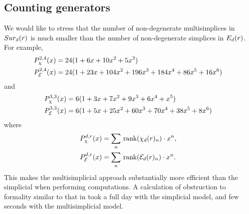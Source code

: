 
\subsection{Counting generators}

We would like to stress that the number of non-degenerate multisimplices in $Sur_d(r)$ is much smaller than the number of non-degenerate simplices in $E_d(r)$.
For example,
\begin{align*}
	& P_\chi^{2,4}(x) = 24(1+6x+10x^2+5x^3) \\
	& P_{\mathcal{E}}^{2,4}(x) = 24(1+23x+104x^2+196x^3+184x^4+86x^5+16x^6)
\end{align*}
and
\begin{align*}
	& P_\chi^{3,3}(x) = 6(1+3x+7x^2+9x^3+6x^4+x^5) \\
	& P_{\mathcal{E}}^{3,3}(x) = 6(1+5x+25x^2+60x^3+70x^4+38x^5+8x^6 )
\end{align*}
where
\begin{align*}
	P_\chi^{d,r}(x) &= \sum_n \,\operatorname{rank}(\chi_d(r)_n) \cdot x^n, \\
	P_{\mathcal{E}}^{d,r}(x) &= \sum_n \,\operatorname{rank}(\mathcal{E}_d(r)_n) \cdot x^n.
\end{align*}
This makes the multisimplicial approach substantially more efficient than the simplicial
when performing computations.
A calculation of obstruction to formality similar to that in
\cite{salvatore2020planarnonformality} took a full day with the simplicial model, and few seconds with the multisimplicial model.